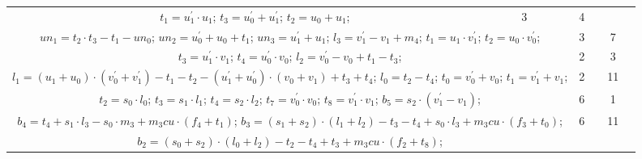 \begin{tabular}{|c|cr|c|c|c|c|}
{$t_1=u^{\prime}_1 \cdot u_1$;\hspace{4pt}
$t_3=u^{\prime}_0+u^{\prime}_1$;\hspace{4pt}
$t_2=u_0+u_1$;\hspace{4pt}
} & 3 &  & 4 & \\
\multicolumn{3}{|R{340pt}|}{ 
$un_1=t_2 \cdot t_3-t_1-un_0$;\hspace{4pt}
$un_2=u^{\prime}_0+u_0+t_1$;\hspace{4pt}
$un_3=u^{\prime}_1+u_1$;\hspace{4pt}
$l_3=v^{\prime}_1-v_1+m_4$;\hspace{4pt}
$t_1=u_1 \cdot v^{\prime}_1$;\hspace{4pt}
$t_2=u_0 \cdot v^{\prime}_0$;\hspace{4pt}
} & 3 &  & 7 & \\
\multicolumn{3}{|R{340pt}|}{ 
$t_3=u^{\prime}_1 \cdot v_1$;\hspace{4pt}
$t_4=u^{\prime}_0 \cdot v_0$;\hspace{4pt}
$l_2=v^{\prime}_0-v_0+t_1-t_3$;\hspace{4pt}
} & 2 &  & 3 & \\
\multicolumn{3}{|R{340pt}|}{ 
$l_1=(u_1+u_0) \cdot (v^{\prime}_0+v^{\prime}_1)-t_1-t_2-(u^{\prime}_1+u^{\prime}_0) \cdot (v_0+v_1)+t_3+t_4$;\hspace{4pt}
$l_0=t_2-t_4$;\hspace{4pt}
$t_0=v^{\prime}_0+v_0$;\hspace{4pt}
$t_1=v^{\prime}_1+v_1$;\hspace{4pt}
} & 2 &  & 11 & \\
\multicolumn{3}{|R{340pt}|}{ 
$t_2=s_0 \cdot l_0$;\hspace{4pt}
$t_3=s_1 \cdot l_1$;\hspace{4pt}
$t_4=s_2 \cdot l_2$;\hspace{4pt}
$t_7=v^{\prime}_0 \cdot v_0$;\hspace{4pt}
$t_8=v^{\prime}_1 \cdot v_1$;\hspace{4pt}
$b_5=s_2 \cdot (v^{\prime}_1-v_1)$;\hspace{4pt}
} & 6 &  & 1 & \\
\multicolumn{3}{|R{340pt}|}{ 
$b_4=t_4+s_1 \cdot l_3-s_0 \cdot m_3+m_3cu \cdot (f_4+t_1)$;\hspace{4pt}
$b_3=(s_1+s_2) \cdot (l_1+l_2)-t_3-t_4+s_0 \cdot l_3+m_3cu \cdot (f_3+t_0)$;\hspace{4pt}
} & 6 &  & 11 & \\
\multicolumn{3}{|R{340pt}|}{ 
$b_2=(s_0+s_2) \cdot (l_0+l_2)-t_2-t_4+t_3+m_3cu \cdot (f_2+t_8)$;\hspace{4pt}
}
\end{tabular}
